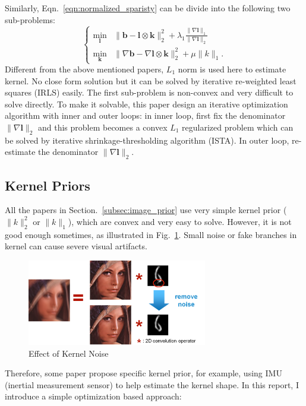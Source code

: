 \documentclass[journal, onecolumn, 10pt]{IEEEtran}
\begin{document}
Similarly, Eqn.~\ref{eqn:normalized_sparisty} can be divide into the following two sub-problems:
\begin{equation}
\begin{cases}
\min_{\mathbf{l}} &\| \mathbf{b} - \mathbf{l} \otimes \mathbf{k} \|_2^2 + \lambda_1 \frac{\|\nabla\mathbf{l}\|_1}{\|\nabla\mathbf{l}\|_2} \\
\min_{\mathbf{k}} &\| \nabla\mathbf{b} - \nabla\mathbf{l} \otimes \mathbf{k} \|_2^2 + \mu \|k\|_1.
\end{cases}
\label{eqn:normalized_sparsity_alter}
\end{equation}
Different from the above mentioned papers, $L_1$ norm is used here to estimate kernel. No close form solution but it can be solved by iterative re-weighted least squares (IRLS) easily. The first sub-problem is non-convex and very difficult to solve directly. To make it solvable, this paper design an iterative optimization algorithm with inner and outer loops: in inner loop, first fix the denominator $\|\nabla \mathbf{l}\|_2$ and this problem becomes a convex $L_1$ regularized problem which can be solved by iterative shrinkage-thresholding algorithm (ISTA)\cite{beck2009fast}. In outer loop, re-estimate the denominator $\|\nabla \mathbf{l}\|_2$.

\subsection{Kernel Priors}
\label{subsec:kernel_prior}
All the papers in Section.~\ref{subsec:image_prior} use very simple kernel prior ($\|k\|_2^2$ or $\|k\|_1$), which are convex and very easy to solve. However, it is not good enough sometimes, as illustrated in Fig.~\ref{fig:kernel_noise}. Small noise or fake branches in kernel can cause severe visual artifacts.
\begin{figure}[h!]
\centering
\includegraphics[width = 0.7\textwidth]{pic/kernel_noise.png}
\caption{Effect of Kernel Noise}
\label{fig:kernel_noise}
\end{figure}
Therefore, some paper propose specific kernel prior, for example, using IMU (inertial measurement sensor) to help estimate the kernel shape. In this report, I introduce a simple optimization based approach:
\end{document}
